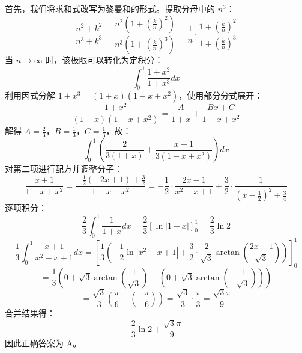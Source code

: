 \begin{questions}
\begin{solution}
首先，我们将求和式改写为黎曼和的形式。提取分母中的 $n^3$：
\[
\frac{n^2 + k^2}{n^3 + k^3} = \frac{n^2 \left( 1 + \left( \frac{k}{n} \right)^2 \right)}{n^3 \left( 1 + \left( \frac{k}{n} \right)^3 \right)} = \frac{1}{n} \cdot \frac{1 + \left( \frac{k}{n} \right)^2}{1 + \left( \frac{k}{n} \right)^3}
\]
当 $n \to \infty$ 时，该极限可以转化为定积分：
\[
\int_{0}^{1} \frac{1 + x^2}{1 + x^3} dx
\]
利用因式分解 $1 + x^3 = (1 + x)(1 - x + x^2)$，使用部分分式展开：
\[
\frac{1 + x^2}{(1 + x)(1 - x + x^2)} = \frac{A}{1 + x} + \frac{Bx + C}{1 - x + x^2}
\]
解得 $A = \frac{2}{3}$，$B = \frac{1}{3}$，$C = \frac{1}{3}$，故：
\[
\int_{0}^{1} \left( \frac{2}{3(1 + x)} + \frac{x + 1}{3(1 - x + x^2)} \right) dx
\]
对第二项进行配方并调整分子：
\[
\frac{x + 1}{1 - x + x^2} = \frac{-\frac{1}{2}(-2x + 1) + \frac{3}{2}}{1 - x + x^2} = -\frac{1}{2} \cdot \frac{2x - 1}{x^2 - x + 1} + \frac{3}{2} \cdot \frac{1}{\left( x - \frac{1}{2} \right)^2 + \frac{3}{4}}
\]
逐项积分：
\[
\frac{2}{3} \int_{0}^{1} \frac{1}{1 + x} dx = \frac{2}{3} \left[ \ln|1 + x| \right]_{0}^{1} = \frac{2}{3} \ln 2
\]
\[
\frac{1}{3} \int_{0}^{1} \frac{x + 1}{x^2 - x + 1} dx = \left[ \frac{1}{3} \left( -\frac{1}{2} \ln|x^2 - x + 1| + \frac{3}{2} \cdot \frac{2}{\sqrt{3}} \arctan\left( \frac{2x - 1}{\sqrt{3}} \right) \right) \right]_{0}^{1}
\]
\[
= \frac{1}{3} \left( 0 + \sqrt{3} \arctan\left( \frac{1}{\sqrt{3}} \right) - \left( 0 + \sqrt{3} \arctan\left( -\frac{1}{\sqrt{3}} \right) \right) \right)
\]
\[
= \frac{\sqrt{3}}{3} \left( \frac{\pi}{6} - \left( -\frac{\pi}{6} \right) \right) = \frac{\sqrt{3}}{3} \cdot \frac{\pi}{3} = \frac{\sqrt{3}\pi}{9}
\]
合并结果得：
\[
\frac{2}{3} \ln 2 + \frac{\sqrt{3}\pi}{9}
\]
因此正确答案为 A。
\end{solution}


\end{questions}
